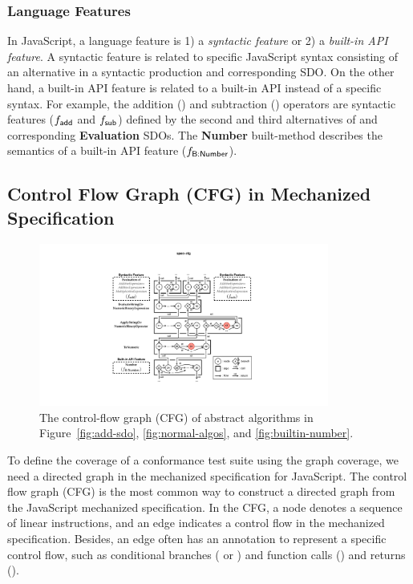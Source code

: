 \subsubsection{Language Features}\label{sec:feat}

In JavaScript, a language feature is 1) a \textit{syntactic feature} or 2) a
\textit{built-in API feature}.
%
A syntactic feature is related to specific JavaScript syntax consisting of an
alternative in a syntactic production and corresponding SDO.
%
On the other hand, a built-in API feature is related to a built-in API instead
of a specific syntax.
%
For example, the addition (\scode{+}) and subtraction (\scode{-}) operators are
syntactic features ($f_{\textsf{add}}$ and $f_{\textsf{sub}}$) defined by the second and third
alternatives of  and corresponding \textbf{Evaluation}
SDOs.
%
The \textbf{Number} built-method describes the semantics of a built-in
 API feature ($f_{\textsf{B:Number}}$).


\subsection{Control Flow Graph (CFG) in Mechanized Specification}\label{sec:cfg}

\begin{figure}
  \centering
  \includegraphics[width=0.85\textwidth]{img/spec-cfg}
  \caption{
    The control-flow graph (CFG) of abstract algorithms in
    Figure~\ref{fig:add-sdo}, \ref{fig:normal-algos}, and
    \ref{fig:builtin-number}.
  }
  \label{fig:spec-cfg}
\end{figure}


To define the coverage of a conformance test suite using the graph coverage, we
need a directed graph in the mechanized specification for JavaScript.
%
The control flow graph (CFG) is the most common way to construct a directed
graph from the JavaScript mechanized specification.
%
In the CFG, a node denotes a sequence of linear instructions, and an edge
indicates a control flow in the mechanized specification.
%
Besides, an edge often has an annotation to represent a specific control flow,
such as conditional branches ( or ) and function calls
() and returns ().

